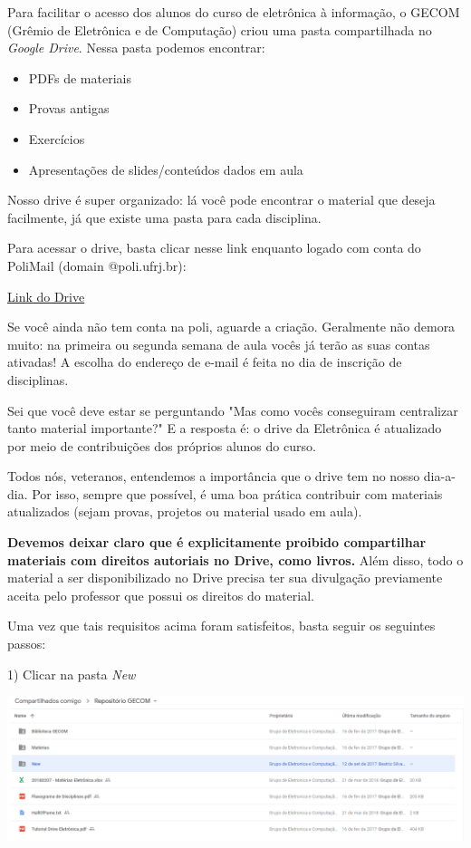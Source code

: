 	Para facilitar o acesso dos alunos do curso de eletrônica à informação, o GECOM (Grêmio de Eletrônica e de Computação) criou uma pasta compartilhada no \textit{Google Drive}. Nessa pasta podemos encontrar:

	\begin{itemize}
        \item PDFs de materiais
        \item Provas antigas
        \item Exercícios
        \item Apresentações de slides/conteúdos dados em aula
	\end{itemize}
	
	Nosso drive é super organizado: lá você pode encontrar o material que deseja facilmente, já que existe uma pasta para cada disciplina. 

	Para acessar o drive, basta clicar nesse link enquanto logado com conta do PoliMail (domain @poli.ufrj.br): 
    \begin{center}
    	\href{http://bit.ly/2TciLzG}{Link do Drive}
   	\end{center}

	Se você ainda não tem conta na poli, aguarde a criação. Geralmente não demora muito: na primeira ou segunda semana de aula vocês já terão as suas contas ativadas! A escolha do endereço de e-mail é feita no dia de inscrição de disciplinas.
    
    Sei que você deve estar se perguntando "Mas como vocês conseguiram centralizar tanto material importante?"  E a resposta é: o drive da Eletrônica é atualizado por meio de contribuições dos próprios alunos do curso. 
    
    Todos nós, veteranos, entendemos a importância que o drive tem no nosso dia-a-dia. Por isso, sempre que possível, é uma boa prática contribuir com materiais atualizados (sejam provas, projetos ou material usado em aula).
    
    \textbf{Devemos deixar claro que é explicitamente proibido compartilhar materiais com direitos autoriais no Drive, como livros.} Além disso, todo o material a ser disponibilizado no Drive precisa ter sua divulgação previamente aceita pelo professor que possui os direitos do material.
    
    Uma vez que tais requisitos acima foram satisfeitos, basta seguir os seguintes passos:
    
    1) Clicar na pasta \textit{New}
    \begin{center}
		\includegraphics[width=\textwidth]{assets/driveGecomEstadoInicial.png}

	\end{center}
    
